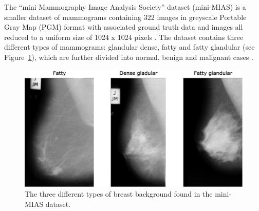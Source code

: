 The ``mini Mammography Image Analysis Society'' dataset (mini-MIAS) is a smaller dataset of mammograms containing 322 images in greyscale Portable Gray Map (PGM) format with associated ground truth data \citep{Suckling1994} and images all reduced to a uniform size of 1024 x 1024 pixels \citep{Vishrutha2014}. The dataset contains three different types of mammograms: glandular dense, fatty and fatty glandular (see Figure~\ref{fig:ethics-datasets-mini-mias breast background}), which are further divided into normal, benign and malignant cases \citep{Hepsag2017}.

\begin{figure}[ht]
\centerline{\includegraphics[width=\textwidth]{figures/ethics-datasets/mini-mias breast background.png}}
\caption{\label{fig:ethics-datasets-mini-mias breast background}The three different types of breast background found in the mini-MIAS dataset.}
\end{figure}